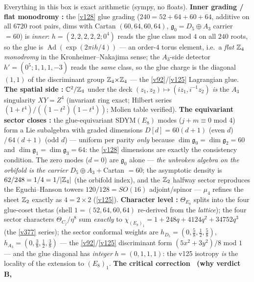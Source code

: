 \begin{keybox}
Everything in this box is exact arithmetic (sympy, no floats). \textbf{Inner grading / flat monodromy
\mE:} the \vref{v128} glue grading ($240=52{+}64{+}60{+}64$, additive on all $6720$ root pairs, dims with
Cartan $(60,64,60,64)$, $\mathfrak g_0=D_5{\oplus}A_3$ carrier $=60$) is \emph{inner}:
$h=(2,2,2,2,2;0^4)$ reads the glue class mod $4$ on all $240$ roots, so the glue is
$\operatorname{Ad}(\exp(2\pi ih/4))$ --- an order-$4$ torus element, i.e.\ a \emph{flat $\mathbb Z_4$ monodromy}
in the Kronheimer--Nakajima sense; the $A_3$-side detector $h'=(0^5;1,1,1,-3)$ reads the \emph{same}
class, so the glue charge is the diagonal $(1,1)$ of the discriminant group $\mathbb Z_4{\times}\mathbb Z_4$ --- the
\vref{v92}/\vref{v125} Lagrangian glue. \textbf{The spatial side \mE:} $\mathbb C^2/\mathbb Z_4$ under the deck
$(z_1,z_2)\mapsto(iz_1,i^{-1}z_2)$ \emph{is} the $A_3$ singularity $XY=Z^4$ (invariant ring exact; Hilbert
series $(1{+}t^4)/((1{-}t^2)(1{-}t^4))$; Molien table verified). \textbf{The equivariant sector closes
\mE:} the glue-equivariant SDYM$(E_8)$ modes ($j+m\equiv0$ mod $4$) form a Lie subalgebra with graded
dimensions $D[d]=60(d{+}1)$ (even $d$) $/\,64(d{+}1)$ (odd $d$) --- uniform per parity \emph{only} because
$\dim\mathfrak g_0=\dim\mathfrak g_2=60$ and $\dim\mathfrak g_1=\dim\mathfrak g_3=64$: the \vref{v128}
dimensions are exactly the consistency condition. The zero modes ($d{=}0$) are $\mathfrak g_0$ alone ---
\emph{the unbroken algebra on the orbifold is the carrier} $D_5{\oplus}A_3{+}$Cartan $=60$; the asymptotic
density is $62/248=1/4=1/|\mathbb Z_4|$ (the orbifold index), and the $\mathbb Z_2$ halfway sector reproduces the
Eguchi--Hanson towers $120/128=SO(16)$ adjoint/spinor --- $\mu_4$ refines the sheet $\mathbb Z_2$ exactly as
$4=2\times2$ (\vref{v125}). \textbf{Character level \mE:} $\Theta_{E_8}$ splits into the four glue-coset
thetas (shell $1=(52,64,60,64)$ re-derived from the \emph{lattice}); the four sector characters
$\Theta_{C_j}/\eta^8$ sum \emph{exactly} to $\chi_{(E_8)_1}=1{+}248q{+}4124q^2{+}34752q^3$ (the
\vref{v377} series); the sector conformal weights are $h_{D_5}=(0,\tfrac58,\tfrac12,\tfrac58)$,
$h_{A_3}=(0,\tfrac38,\tfrac12,\tfrac38)$ --- the \vref{v92}/\vref{v125} discriminant form
$(5x^2{+}3y^2)/8$ mod $1$ --- and the glue diagonal has \emph{integer} $h=(0,1,1,1)$: the v125 isotropy
\emph{is} the locality of the extension to $(E_8)_1$. \textbf{The critical correction \mE\ (why verdict B,
}
\end{keybox}

